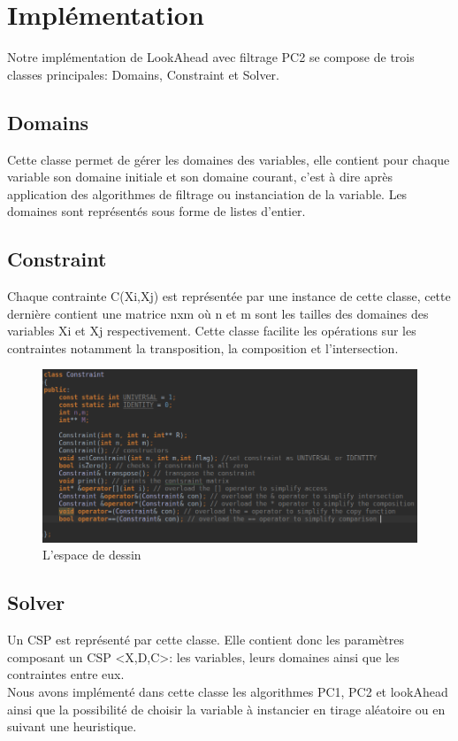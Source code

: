\documentclass[12pt]{report}
\begin{document}
\section{Implémentation}
Notre implémentation de LookAhead avec filtrage PC2 se compose de trois classes principales: Domains, Constraint et Solver.
\subsection{Domains}
Cette classe permet de gérer les domaines des variables, elle contient pour chaque variable son domaine initiale et son domaine courant, c’est à dire après application des algorithmes de filtrage ou instanciation de la variable. Les domaines sont représentés sous forme de listes d'entier.
\subsection{Constraint}
Chaque contrainte C(Xi,Xj) est représentée par une instance de cette classe, cette dernière contient une matrice nxm où n et m sont les tailles des domaines des variables Xi et Xj respectivement. Cette classe facilite les opérations sur les contraintes notamment la transposition, la composition et l’intersection.
\begin{figure}[H]
	\centering
	\includegraphics[scale=0.55]{imgs/constraint.png}
	\caption{L'espace de dessin}
	\label{fig:Cons}
\end{figure}
\subsection{Solver}
Un CSP est représenté par cette classe. Elle contient donc les paramètres composant un CSP <X,D,C>: les variables, leurs domaines ainsi que les contraintes entre eux. \\
Nous avons implémenté dans cette classe les algorithmes PC1, PC2 et lookAhead ainsi que la possibilité de choisir la variable à instancier en tirage aléatoire ou en suivant une heuristique.
\end{document}
